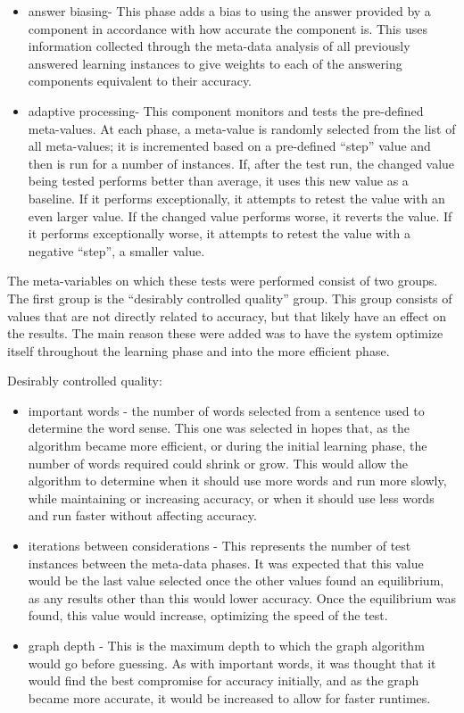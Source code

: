 \begin{itemize}
\item answer biasing- This phase adds a bias to using the answer provided by a 
component in accordance with how accurate the component is.  This uses 
information collected through the meta-data analysis of all previously answered 
learning instances to give weights to each of the answering components 
equivalent to their accuracy.     
\item adaptive processing- This component monitors and tests the pre-defined 
meta-values.  At each phase, a meta-value is randomly selected from the list of 
all meta-values; it is incremented based on a pre-defined ``step'' value and 
then is run for a number of instances. If, after the test run, the changed value 
being tested performs better than average, it uses this new value as a baseline. 
If it performs exceptionally, it attempts to retest the value with an even larger 
value.  If the changed value performs worse, it reverts the value. If it performs 
exceptionally worse, it attempts to retest the value with a negative ``step'', a 
smaller value. 
\end{itemize}

The meta-variables on which these tests were performed consist of two groups. The
first group is the ``desirably controlled quality'' group.  This group
consists of values that are not directly related to accuracy, but that likely have an effect
on the results.  The main reason these were added was to have the system
optimize itself throughout the learning phase and into the more efficient phase.

Desirably controlled quality:

\begin{itemize}
\item important words - the number of words selected from a sentence used to 
determine the word sense. This one was selected in hopes that, as the algorithm 
became more efficient, or during the initial learning phase, the number of words 
required could shrink or grow. This would allow the algorithm to determine when 
it should use more words and run more slowly, while maintaining or increasing 
accuracy, or when it should use less words and run faster without affecting 
accuracy.     

\item iterations between considerations - This represents the number of test 
instances between the meta-data phases. It was expected that this value would be
 the last value selected once the other values found an equilibrium, as any 
 results other than this would lower accuracy. Once the equilibrium was found, 
 this value would increase, optimizing the speed of the test.     
\item graph depth - This is the maximum depth to which the graph algorithm would go before 
guessing.  As with important words, it was thought that it would find the best 
compromise for accuracy initially, and as the graph became more accurate, it 
would be increased to allow for faster
runtimes.

\end{itemize}

